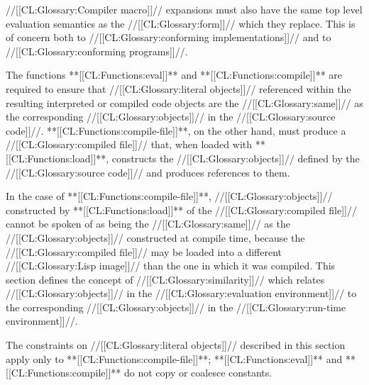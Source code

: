 //[[CL:Glossary:Compiler macro]]// expansions must also have the same
top level evaluation semantics as the //[[CL:Glossary:form]]// which they replace.
This is of concern both to //[[CL:Glossary:conforming implementations]]// and to
//[[CL:Glossary:conforming programs]]//.


\endsubsubsubsection%

\endsubsubsection%

\endsubSection%













The functions **[[CL:Functions:eval]]** and **[[CL:Functions:compile]]** are
required to ensure that //[[CL:Glossary:literal objects]]// referenced within the resulting
interpreted or compiled code objects are the //[[CL:Glossary:same]]// as the
corresponding //[[CL:Glossary:objects]]// in the //[[CL:Glossary:source code]]//.
**[[CL:Functions:compile-file]]**, on the other hand, 
must produce a //[[CL:Glossary:compiled file]]// that, when loaded with
**[[CL:Functions:load]]**, constructs the //[[CL:Glossary:objects]]// defined by the
//[[CL:Glossary:source code]]// and produces references to them.
 
In the case of **[[CL:Functions:compile-file]]**, //[[CL:Glossary:objects]]//
constructed by **[[CL:Functions:load]]** of the //[[CL:Glossary:compiled file]]// cannot be spoken
of as being the //[[CL:Glossary:same]]// as the //[[CL:Glossary:objects]]// constructed at
compile time, because the //[[CL:Glossary:compiled file]]// may be loaded into a different
//[[CL:Glossary:Lisp image]]// than the one in which it was compiled.  This section
defines the concept of //[[CL:Glossary:similarity]]// which relates
//[[CL:Glossary:objects]]// in the //[[CL:Glossary:evaluation environment]]// to the
corresponding //[[CL:Glossary:objects]]// in the //[[CL:Glossary:run-time environment]]//.
 
The constraints on //[[CL:Glossary:literal objects]]// described in this section
apply only to **[[CL:Functions:compile-file]]**;
**[[CL:Functions:eval]]** and **[[CL:Functions:compile]]** do not copy or coalesce constants.


